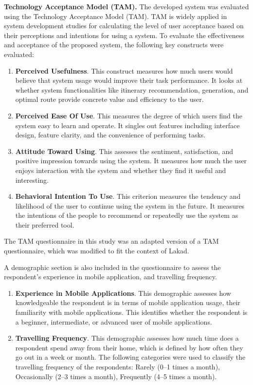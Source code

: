 \textbf{Technology Acceptance Model (TAM).} The developed system was evaluated using the Technology Acceptance Model (TAM). TAM is widely applied in system development studies for calculating the level of user acceptance based on their perceptions and intentions for using a system. To evaluate the effectiveness and acceptance of the proposed system, the following key constructs were evaluated:
\begin{enumerate}
	\item \textbf{Perceived Usefulness}. This construct measures how much users would believe that system usage would improve their task performance. It looks at whether system functionalities like itinerary recommendation, generation, and optimal route provide concrete value and efficiency to the user.
	\item \textbf{Perceived Ease Of Use}. This measures the degree of which users find the system easy to learn and operate. It singles out features including interface design, feature clarity, and the convenience of performing tasks.
	\item \textbf{Attitude Toward Using}. This assesses the sentiment, satisfaction, and positive impression towards using the system. It measures how much the user enjoys interaction with the system and whether they find it useful and interesting.
	\item \textbf{Behavioral Intention To Use}. This criterion measures the tendency and likelihood of the user to continue using the system in the future. It measures the intentions of the people to recommend or repeatedly use the system as their preferred tool.
\end{enumerate}

The TAM questionnaire in this study was an adapted version of a TAM questionnaire, which was modified to fit the context of Lakad. 

\newpage
A demographic section is also included in the questionnaire to assess the respondent’s experience in mobile application, and travelling frequency.

\begin{enumerate}
	\item \textbf{Experience in Mobile Applications}. This demographic assesses how knowledgeable the respondent is in terms of mobile application usage, their familiarity with mobile applications. This identifies whether the respondent is a beginner, intermediate, or advanced user of mobile applications. 
	

	\item \textbf{Travelling Frequency}. This demographic assesses how much time does a respondent spend away from their home, which is defined by how often they go out in a week or month. The following categories were used to classify the travelling frequency of the respondents: Rarely (0–1 times a month), Occasionally (2–3 times a month), Frequently (4–5 times a month).
\end{enumerate}

